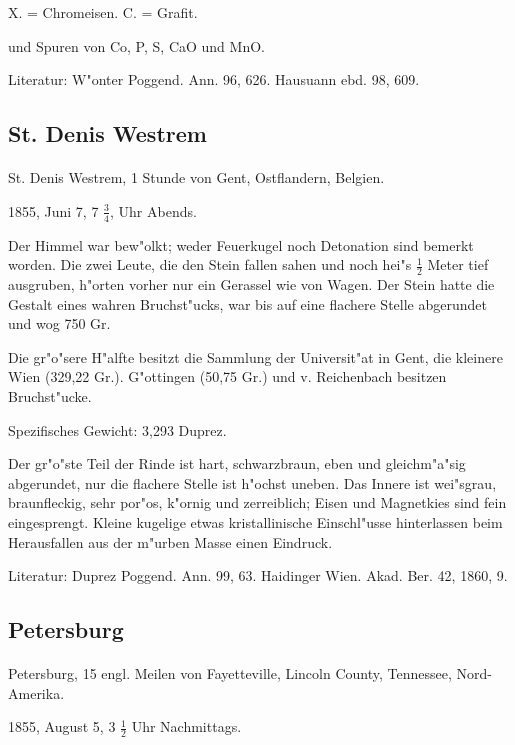 \documentclass[a4paper, 11pt, oneside]{article}
\begin{document}
X. = Chromeisen. C. = Grafit.

und Spuren von Co, P, S, CaO und MnO.

\footnotesize
Literatur: W"onter Poggend. Ann. 96, 626. Hausuann ebd. 98, 609.

\subsection{St. Denis Westrem}
\normalsize
\paragraph{}
St. Denis Westrem, 1 Stunde von Gent, Ostflandern, Belgien.

1855, Juni 7, 7 $\frac{3}{4}$, Uhr Abends.

Der Himmel war bew"olkt; weder Feuerkugel noch Detonation sind bemerkt worden. Die zwei Leute, die den Stein fallen sahen und noch hei"s $\frac{1}{2}$ Meter tief ausgruben, h"orten vorher nur ein Gerassel wie von Wagen. Der Stein hatte die Gestalt eines wahren Bruchst"ucks, war bis auf eine flachere Stelle abgerundet und wog 750 Gr.

Die gr"o"sere H"alfte besitzt die Sammlung der Universit"at in Gent, die kleinere Wien (329,22 Gr.). G"ottingen (50,75 Gr.) und v. Reichenbach besitzen Bruchst"ucke.

Spezifisches Gewicht: 3,293 Duprez.

Der gr"o"ste Teil der Rinde ist hart, schwarzbraun, eben und gleichm"a"sig abgerundet, nur die flachere Stelle ist h"ochst uneben. Das Innere ist wei"sgrau, braunfleckig, sehr por"os, k"ornig und zerreiblich; Eisen und Magnetkies sind fein eingesprengt. Kleine kugelige etwas kristallinische Einschl"usse hinterlassen beim Herausfallen aus der m"urben Masse einen Eindruck.

\footnotesize
Literatur: Duprez Poggend. Ann. 99, 63. Haidinger Wien. Akad. Ber. 42, 1860, 9.

\subsection{Petersburg}
\normalsize
\paragraph{}
Petersburg, 15 engl. Meilen von Fayetteville, Lincoln County, Tennessee, Nord-Amerika.

1855, August 5, 3 $\frac{1}{2}$ Uhr Nachmittags.
\end{document}

